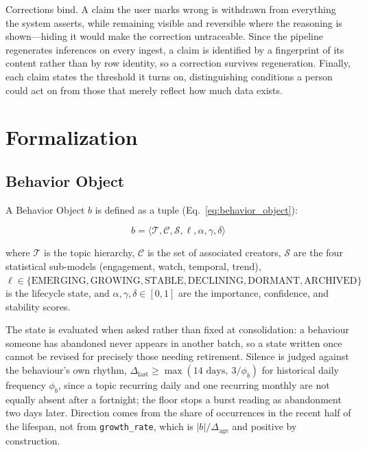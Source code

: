\documentclass[conference]{IEEEtran}
\begin{document}
Corrections bind. A claim the user marks wrong is withdrawn from everything the system asserts, while remaining visible and reversible where the reasoning is shown---hiding it would make the correction untraceable. Since the pipeline regenerates inferences on every ingest, a claim is identified by a fingerprint of its content rather than by row identity, so a correction survives regeneration. Finally, each claim states the threshold it turns on, distinguishing conditions a person could act on from those that merely reflect how much data exists.

\section{Formalization}
\label{sec:formulation}

\subsection{Behavior Object}
A Behavior Object $b$ is defined as a tuple (Eq.~\eqref{eq:behavior_object}):

\begin{equation}
b = \langle \mathcal{T}, \mathcal{C}, \mathcal{S}, \ell, \alpha, \gamma, \delta \rangle
\label{eq:behavior_object}
\end{equation}

where $\mathcal{T}$ is the topic hierarchy, $\mathcal{C}$ is the set of associated creators, $\mathcal{S}$ are the four statistical sub-models (engagement, watch, temporal, trend), $\ell \in \{\text{EMERGING}, \text{GROWING}, \text{STABLE}, \text{DECLINING}, \text{DORMANT}, \text{ARCHIVED}\}$ is the lifecycle state, and $\alpha, \gamma, \delta \in [0,1]$ are the importance, confidence, and stability scores.

The state is evaluated when asked rather than fixed at consolidation: a behaviour someone has abandoned never appears in another batch, so a state written once cannot be revised for precisely those needing retirement. Silence is judged against the behaviour's own rhythm, $\Delta_{\text{last}} \geq \max(14\text{ days},\ 3/\phi_b)$ for historical daily frequency $\phi_b$, since a topic recurring daily and one recurring monthly are not equally absent after a fortnight; the floor stops a burst reading as abandonment two days later. Direction comes from the share of occurrences in the recent half of the lifespan, not from \texttt{growth\_rate}, which is $|b|/\Delta_{\text{age}}$ and positive by construction.
\end{document}
